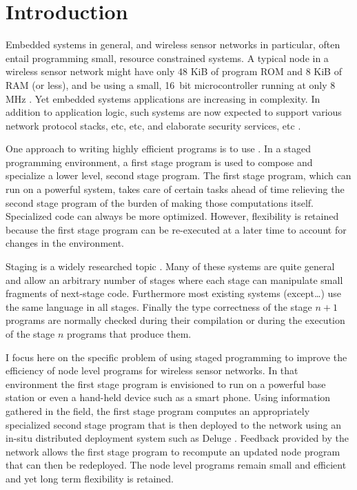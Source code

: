 \chapter{Introduction}
\label{chap:introduction}

Embedded systems in general, and wireless sensor networks in particular, often entail
programming small, resource constrained systems. A typical node in a wireless sensor network
might have only 48 KiB of program ROM and 8 KiB of RAM (or less), and be using a small, 16~bit
microcontroller running at only 8 MHz \cite{XXX}. Yet embedded systems applications are
increasing in complexity. In addition to application logic, such systems are now expected to
support various network protocol stacks, etc, etc, and elaborate security services, etc
\cite{XXX}.

One approach to writing highly efficient programs is to use . In a staged
programming environment, a first stage program is used to compose and specialize a lower level,
second stage program. The first stage program, which can run on a powerful system, takes care of
certain tasks ahead of time relieving the second stage program of the burden of making those
computations itself. Specialized code can always be more optimized. However, flexibility is
retained because the first stage program can be re-executed at a later time to account for
changes in the environment.

Staging is a widely researched topic
\cite{Taha-MetaML,Sheard-TemplateHaskell,Mainland-Flask-2008,FramedML}.  Many of these systems are quite general and allow an
arbitrary number of stages where each stage can manipulate small fragments of next-stage code.
Furthermore most existing systems (except\ldots) use the same language in all stages. Finally
the type correctness of the stage $n+1$ programs are normally checked during their compilation
or during the execution of the stage $n$ programs that produce them.

I focus here on the specific problem of using staged programming to improve the efficiency of
node level programs for wireless sensor networks. In that environment the first stage program is
envisioned to run on a powerful base station or even a hand-held device such as a smart phone.
Using information gathered in the field, the first stage program computes an appropriately
specialized second stage program that is then deployed to the network using an in-situ
distributed deployment system such as Deluge \cite{XXX}. Feedback provided by the network allows
the first stage program to recompute an updated node program that can then be redeployed. The
node level programs remain small and efficient and yet long term flexibility is retained.

